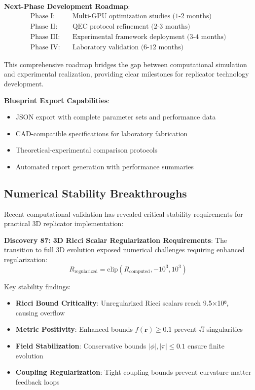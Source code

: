 \documentclass[11pt]{article}
\begin{document}
\textbf{Next-Phase Development Roadmap}:
\begin{align}
\text{Phase I:} &\quad \text{Multi-GPU optimization studies (1-2 months)} \\
\text{Phase II:} &\quad \text{QEC protocol refinement (2-3 months)} \\
\text{Phase III:} &\quad \text{Experimental framework deployment (3-4 months)} \\
\text{Phase IV:} &\quad \text{Laboratory validation (6-12 months)}
\end{align}

This comprehensive roadmap bridges the gap between computational simulation and experimental realization, providing clear milestones for replicator technology development.

\textbf{Blueprint Export Capabilities}:
\begin{itemize}
\item JSON export with complete parameter sets and performance data
\item CAD-compatible specifications for laboratory fabrication
\item Theoretical-experimental comparison protocols
\item Automated report generation with performance summaries
\end{itemize}

\subsection{Numerical Stability Breakthroughs}

Recent computational validation has revealed critical stability requirements for practical 3D replicator implementation:

\textbf{Discovery 87: 3D Ricci Scalar Regularization Requirements}:
The transition to full 3D evolution exposed numerical challenges requiring enhanced regularization:
\begin{equation}
R_{\text{regularized}} = \text{clip}(R_{\text{computed}}, -10^{3}, 10^{3})
\end{equation}

Key stability findings:
\begin{itemize}
\item \textbf{Ricci Bound Criticality}: Unregularized Ricci scalars reach 9.5×10⁸, causing overflow
\item \textbf{Metric Positivity}: Enhanced bounds $f(\mathbf{r}) \geq 0.1$ prevent √f singularities  
\item \textbf{Field Stabilization}: Conservative bounds $|\phi|, |\pi| \leq 0.1$ ensure finite evolution
\item \textbf{Coupling Regularization}: Tight coupling bounds prevent curvature-matter feedback loops
\end{itemize}
\end{document}
